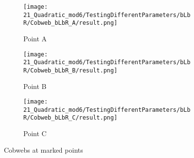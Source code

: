 \begin{figure}
    \centering
    \begin{subfigure}{0.3\textwidth}
        \centering
        \texttt{[image: 21\_Quadratic\_mod6/TestingDifferentParameters/bLbR/Cobweb\_bLbR\_A/result.png]}
        \caption{Point A}
        \label{fig:quad.full.bLbR.CobwebA}
    \end{subfigure}
    \begin{subfigure}{0.3\textwidth}
        \centering
        \texttt{[image: 21\_Quadratic\_mod6/TestingDifferentParameters/bLbR/Cobweb\_bLbR\_B/result.png]}
        \caption{Point B}
        \label{fig:quad.full.bLbR.CobwebB}
    \end{subfigure}
    \begin{subfigure}{0.3\textwidth}
        \centering
        \texttt{[image: 21\_Quadratic\_mod6/TestingDifferentParameters/bLbR/Cobweb\_bLbR\_C/result.png]}
        \caption{Point C}
        \label{fig:quad.full.bLbR.CobwebC}
    \end{subfigure}
    \caption{Cobwebs at marked points}
    \label{fig:quad.full.bLbR.Cobwebs}
\end{figure}
